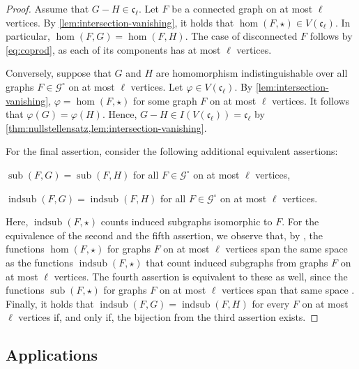 \documentclass[11pt]{scrartcl}
\theoremstyle{definition}
\theoremstyle{plain}
\theoremstyle{remark}
\renewcommand\phi\varphi
\DeclareMathOperator{\indsub}{indsub}
\DeclareMathOperator{\sub}{sub}
\newcommand{\lG}{\mathcal{G}^\circ}
\begin{document}
	\lemCl*
	\begin{proof}
		Assume that $G - H \in \mathfrak{c}_\ell$.
		Let $F$ be a connected graph on at most $\ell$ vertices.
		By \cref{lem:intersection-vanishing}, it holds that $\hom(F, \star) \in V(\mathfrak{c}_\ell)$.
		In particular, $\hom(F, G) = \hom(F, H)$.
		The case of disconnected $F$ follows by \cref{eq:coprod}, as each of its components has at most $\ell$ vertices.

		Conversely, suppose that $G$ and $H$ are homomorphism indistinguishable over all graphs $F \in \lG$ on at most $\ell$ vertices.
		Let $\phi \in V(\mathfrak{c}_\ell)$.
		By \cref{lem:intersection-vanishing}, $\phi = \hom(F, \star)$ for some graph $F$ on at most $\ell$ vertices.
		It follows that $\phi(G) = \phi(H)$.
		Hence, $G -H \in I(V(\mathfrak{c}_\ell)) = \mathfrak{c}_\ell$ by  \cref{thm:nullstellensatz,lem:intersection-vanishing}.

        For the final assertion, consider the following additional equivalent assertions:
        \begin{assertions}[start=4]
            \item $\sub(F, G) = \sub(F, H)$ for all $F\in \lG$ on at most $\ell$ vertices,
			\item $\indsub(F, G) = \indsub(F, H)$ for all $F\in \lG$ on at most $\ell$ vertices.
        \end{assertions}    
        Here, $\indsub(F, \star)$ counts induced subgraphs isomorphic to $F$.
        For the equivalence of the second and the fifth assertion, 
		we observe that, by \cite{curticapean_homomorphisms_2017},
		the functions $\hom(F, \star)$ for graphs $F$ on at most $\ell$ vertices
		span the same space as the functions $\indsub(F, \star)$ that count induced subgraphs from graphs $F$ on at most $\ell$ vertices.
		The fourth assertion is equivalent to these as well,
		since the functions $\sub(F, \star)$ for graphs $F$ on at most $\ell$ vertices
		span that same space \cite{curticapean_homomorphisms_2017}.
		Finally, it holds that $\indsub(F, G) = \indsub(F, H)$ for every $F$ on at most $\ell$ vertices
		if, and only if, the bijection from the third assertion exists.
	\end{proof}



	\subsection{Applications}

	\label{sec:applications}
\end{document}
